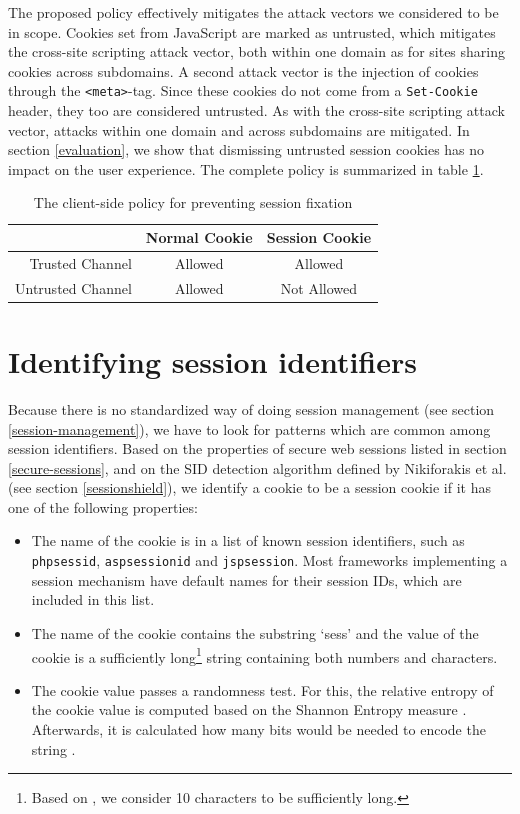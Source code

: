The proposed policy effectively mitigates the attack vectors we considered to be in scope. Cookies set from JavaScript are marked as untrusted, which mitigates the cross-site scripting attack vector, both within one domain as for sites sharing cookies across subdomains. A second attack vector is the injection of cookies through the \texttt{<meta>}-tag. Since these cookies do not come from a \texttt{Set-Cookie} header, they too are considered untrusted. As with the cross-site scripting attack vector, attacks within one domain and across subdomains are mitigated. In section \ref{evaluation}, we show that dismissing untrusted session cookies has no impact on the user experience. The complete policy is summarized in table \ref{tab:nofix-policy}.

\begin{table}[htb]
	\centering
	\begin{tabular}{r|cc}
		& Normal Cookie & Session Cookie\\
		\hline
		Trusted Channel & Allowed & Allowed\\
		Untrusted Channel & Allowed & Not Allowed\\
	\end{tabular}
	\caption{The client-side policy for preventing session fixation}
	\label{tab:nofix-policy}
\end{table}

\section{Identifying session identifiers}\label{detecting-sids}

Because there is no standardized way of doing session management (see section \ref{session-management}), we have to look for patterns which are common among session identifiers. Based on the properties of secure web sessions listed in section \ref{secure-sessions}, and on the SID detection algorithm defined by Nikiforakis et al. \cite{Nikiforakis2010} (see section \ref{sessionshield}), we identify a cookie to be a session cookie if it has one of the following properties:
\begin{itemize}
	\item The name of the cookie is in a list of known session identifiers, such as \texttt{phpsessid}, \texttt{aspsessionid} and \texttt{jspsession}. Most frameworks implementing a session mechanism have default names for their session IDs, which are included in this list.
	\item The name of the cookie contains the substring `sess' and the value of the cookie is a sufficiently long\footnote{Based on \cite{Nikiforakis2010}, we consider 10 characters to be sufficiently long.} string containing both numbers and characters.
	\item The cookie value passes a randomness test. For this, the relative entropy of the cookie value is computed based on the Shannon Entropy measure \cite{Kaplan2002}. Afterwards, it is calculated how many bits would be needed to encode the string \cite{Nikiforakis2010}.
\end{itemize}

